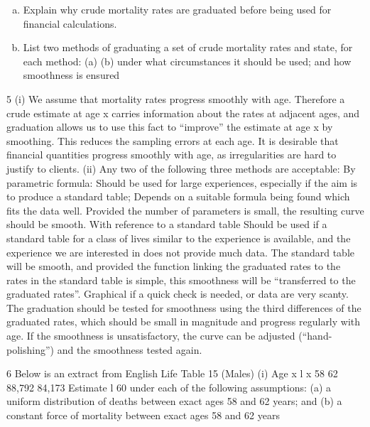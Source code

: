 \documentclass[a4paper,12pt]{article}
\begin{document}
\begin{enumerate}[(a)]
\item
Explain why crude mortality rates are graduated before being used for
financial calculations.
\item 
List two methods of graduating a set of crude mortality rates and state, for
each method:
(a)
(b)
under what circumstances it should be used; and
how smoothness is ensured
\end{enumerate}

\newpage

5
(i)
We assume that mortality rates progress smoothly with age.
Therefore a crude estimate at age x carries information about the rates at
adjacent ages, and graduation allows us to use this fact to “improve” the
estimate at age x by smoothing.
This reduces the sampling errors at each age.
It is desirable that financial quantities progress smoothly with age,
as irregularities are hard to justify to clients.
(ii)
Any two of the following three methods are acceptable:
By parametric formula:
Should be used for large experiences, especially if the aim is to produce a
standard table;
Depends on a suitable formula being found which fits the data well.
Provided the number of parameters is small, the resulting curve should be
smooth.
With reference to a standard table
Should be used if a standard table for a class of lives similar to the experience
is available, and the experience we are interested in does not provide much
data.
The standard table will be smooth,
and provided the function linking the graduated rates to the rates in the
standard table is simple, this smoothness will be “transferred to the graduated
rates”.
Graphical
if a quick check is needed, or data are very scanty.
The graduation should be tested for smoothness using the third differences of
the graduated rates, which should be small in magnitude and progress
regularly with age.
If the smoothness is unsatisfactory, the curve can be adjusted (“hand-
polishing”) and the smoothness tested again.
\newpage


6
Below is an extract from English Life Table 15 (Males)
(i)
Age x l x
58
62 88,792
84,173
Estimate l 60 under each of the following assumptions:
(a) a uniform distribution of deaths between exact ages 58 and 62 years;
and
(b) a constant force of mortality between exact ages 58 and 62 years
\end{document}

